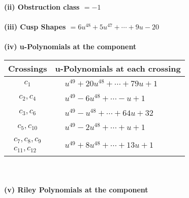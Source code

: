 \documentclass[1p]{elsarticle_modified}
\theoremstyle{definition}
\begin{document}
\flushleft \textbf{(ii) Obstruction class $= -1$}\\~\\
\flushleft \textbf{(iii) Cusp Shapes $= 6 u^{48}+5 u^{47}+\cdots+9 u-20$}\\~\\
\newpage\renewcommand{\arraystretch}{1}
\flushleft \textbf{(iv) u-Polynomials at the component}\newline \\
\begin{tabular}{m{50pt}|m{274pt}}
Crossings & \hspace{64pt}u-Polynomials at each crossing \\
\hline $$\begin{aligned}c_{1}\end{aligned}$$&$\begin{aligned}
&u^{49}+20 u^{48}+\cdots+79 u+1
\end{aligned}$\\
\hline $$\begin{aligned}c_{2},c_{4}\end{aligned}$$&$\begin{aligned}
&u^{49}-6 u^{48}+\cdots- u+1
\end{aligned}$\\
\hline $$\begin{aligned}c_{3},c_{6}\end{aligned}$$&$\begin{aligned}
&u^{49}- u^{48}+\cdots+64 u+32
\end{aligned}$\\
\hline $$\begin{aligned}c_{5},c_{10}\end{aligned}$$&$\begin{aligned}
&u^{49}-2 u^{48}+\cdots+u+1
\end{aligned}$\\
\hline $$\begin{aligned}c_{7},c_{8},c_{9}\\c_{11},c_{12}\end{aligned}$$&$\begin{aligned}
&u^{49}+8 u^{48}+\cdots+13 u+1
\end{aligned}$\\
\hline
\end{tabular}\\~\\
\newpage\renewcommand{\arraystretch}{1}
\flushleft \textbf{(v) Riley Polynomials at the component}\newline \\
\end{document}
